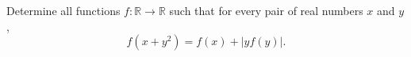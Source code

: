 Determine all functions $f:\mathbb{R}\to\mathbb{R}$ such that for every pair of real numbers $x$ and $y$, \[f(x+y^2)=f(x)+|yf(y)|.\]